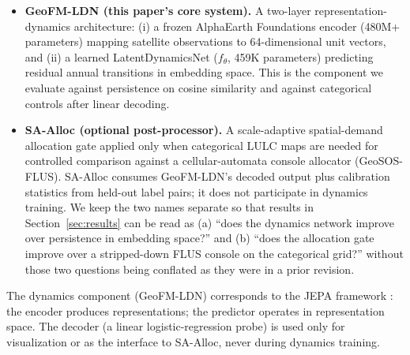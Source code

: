 \documentclass{article}
\begin{document}
\begin{itemize}
\item \textbf{GeoFM-LDN (this paper's core system).} A two-layer representation-dynamics architecture: (i) a frozen AlphaEarth Foundations encoder (480M+ parameters) mapping satellite observations to 64-dimensional unit vectors, and (ii) a learned LatentDynamicsNet ($f_\theta$, 459K parameters) predicting residual annual transitions in embedding space. This is the component we evaluate against persistence on cosine similarity and against categorical controls after linear decoding.
\item \textbf{SA-Alloc (optional post-processor).} A scale-adaptive spatial-demand allocation gate applied only when categorical LULC maps are needed for controlled comparison against a cellular-automata console allocator (GeoSOS-FLUS). SA-Alloc consumes GeoFM-LDN's decoded output plus calibration statistics from held-out label pairs; it does not participate in dynamics training. We keep the two names separate so that results in Section~\ref{sec:results} can be read as (a) ``does the dynamics network improve over persistence in embedding space?'' and (b) ``does the allocation gate improve over a stripped-down FLUS console on the categorical grid?'' without those two questions being conflated as they were in a prior revision.
\end{itemize}

The dynamics component (GeoFM-LDN) corresponds to the JEPA framework \citep{lecun2022jepa}: the encoder produces representations; the predictor operates in representation space. The decoder (a linear logistic-regression probe) is used only for visualization or as the interface to SA-Alloc, never during dynamics training.
\end{document}
